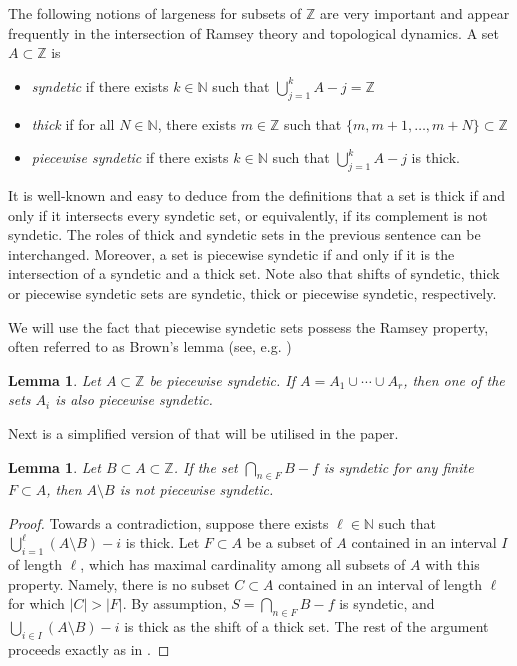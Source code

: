 \documentclass[reqno]{amsart}
\def\Z{{\mathbb Z}}
\def\N{{\mathbb N}}
\newtheorem{lemma}[theorem]{Lemma}
\theoremstyle{definition}
\theoremstyle{remark}
\def\N{{\mathbb N}}
\begin{document}
The following notions of largeness 
for subsets of $\Z$ are very important and appear frequently in 
the intersection of Ramsey theory and topological dynamics. A set 
$A\subset \Z$ is 
\begin{itemize}
    \item \textit{syndetic} if there exists $k\in \N$ such that 
    $\bigcup_{j=1}^k A-j=\Z$
    \item \textit{thick} if for all $N\in \N$, there exists $m\in \Z$ such that $\{m,m+1,\ldots,m+N\} \subset \Z$
    \item \textit{piecewise syndetic} if there exists $k\in \N$ such that $\bigcup_{j=1}^{k} A-j$ is thick.
\end{itemize}

It is well-known and easy to deduce from the definitions that a 
set is thick if and only if it intersects every syndetic set, or 
equivalently, if its complement is not syndetic. The roles of 
thick and syndetic sets in the previous sentence can be 
interchanged. Moreover, a set is piecewise syndetic if and only if 
it is the intersection of a syndetic and a thick set. Note also 
that shifts of syndetic, thick or piecewise syndetic sets are 
syndetic, thick or piecewise syndetic, respectively. 

We will use the fact that piecewise syndetic sets possess the 
Ramsey property, often referred to as Brown's lemma (see, e.g.  \cite[Theorem 4.4]{Hindman_Strauss98})

\begin{lemma}\label{Brown}
Let $A\subset \Z$ be piecewise syndetic. If 
$A=A_1 \cup \cdots \cup A_r$, then one of the sets $A_i$ is also 
piecewise syndetic. 
\end{lemma}

Next is a simplified version of \cite[Lemma 2.1]{GKLMRR} that will be
utilised in the paper. 

\begin{lemma}\label{A-B pws}
Let $B\subset A\subset \Z$. If the set $\bigcap_{n\in F}B-f$ is syndetic for any finite $F\subset A$, then $A\setminus B$ is not piecewise syndetic. 
\end{lemma}

\begin{proof}
Towards a contradiction, suppose there exists $\ell \in \N$ such 
that $\bigcup_{i=1}^{\ell}(A\setminus B)-i$ is thick. Let 
$F\subset A$ be a subset of $A$ contained in an interval $I$ 
of length $\ell$, which has maximal cardinality among all 
subsets of $A$ with this property. Namely, there is no subset 
$C\subset A$ contained in an interval of length $\ell$ for 
which $|C|>|F|$. By assumption, $S=\bigcap_{n\in F}B-f$ is 
syndetic, and $\bigcup_{i\in I}(A\setminus B)-i$ is thick as 
the shift of a thick set. 
The rest of the argument proceeds exactly as in 
\cite{GKLMRR}.    
\end{proof}
\end{document}
